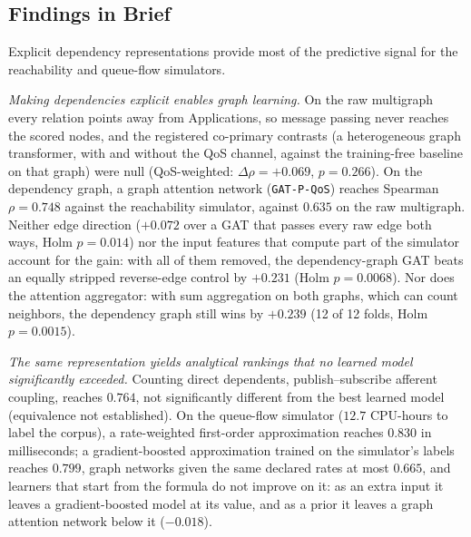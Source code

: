 \subsection{Findings in Brief}
\label{sec:1.findings}

Explicit dependency representations provide most of the predictive signal for the reachability and queue-flow simulators.

\emph{Making dependencies explicit enables graph learning.} On the raw multigraph every relation points away from Applications, so message passing never reaches the scored nodes, and the registered co-primary contrasts (a heterogeneous graph transformer, with and without the QoS channel, against the training-free baseline on that graph) were null (QoS-weighted: $\Delta\rho = +0.069$, $p = 0.266$). On the dependency graph, a graph attention network (\texttt{GAT-P-QoS}) reaches Spearman $\rho = 0.748$ against the reachability simulator, against $0.635$ on the raw multigraph. Neither edge direction ($+0.072$ over a GAT that passes every raw edge both ways, Holm $p = 0.014$) nor the input features that compute part of the simulator account for the gain: with all of them removed, the dependency-graph GAT beats an equally stripped reverse-edge control by $+0.231$ (Holm $p = 0.0068$). Nor does the attention aggregator: with sum aggregation on both graphs, which can count neighbors, the dependency graph still wins by $+0.239$ (12 of 12 folds, Holm $p = 0.0015$).

\emph{The same representation yields analytical rankings that no learned model significantly exceeded.} Counting direct dependents, publish--subscribe afferent coupling, reaches $0.764$, not significantly different from the best learned model (equivalence not established). On the queue-flow simulator ($12.7$ CPU-hours to label the corpus), a rate-weighted first-order approximation reaches $0.830$ in milliseconds; a gradient-boosted approximation trained on the simulator's labels reaches $0.799$, graph networks given the same declared rates at most $0.665$, and learners that start from the formula do not improve on it: as an extra input it leaves a gradient-boosted model at its value, and as a prior it leaves a graph attention network below it ($-0.018$).

